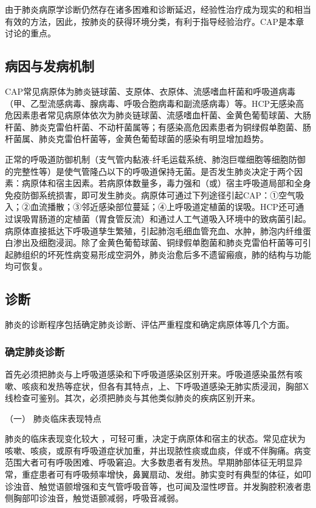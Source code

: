 由于肺炎病原学诊断仍然存在诸多困难和诊断延迟，经验性治疗成为现实的和相当有效的方法，因此，按肺炎的获得环境分类，有利于指导经验治疗。CAP是本章讨论的重点。

\subsection{病因与发病机制}

CAP常见病原体为肺炎链球菌、支原体、衣原体、流感嗜血杆菌和呼吸道病毒（甲、乙型流感病毒、腺病毒、呼吸合胞病毒和副流感病毒）等。HCP无感染高危因素患者常见病原体依次为肺炎链球菌、流感嗜血杆菌、金黄色葡萄球菌、大肠杆菌、肺炎克雷伯杆菌、不动杆菌属等；有感染高危因素患者为铜绿假单胞菌、肠杆菌属、肺炎克雷伯杆菌等，金黄色葡萄球菌的感染有明显增加趋势。

正常的呼吸道防御机制（支气管内黏液-纤毛运载系统、肺泡巨噬细胞等细胞防御的完整性等）是使气管隆凸以下的呼吸道保持无菌。是否发生肺炎决定于两个因素：病原体和宿主因素。若病原体数量多，毒力强和（或）宿主呼吸道局部和全身免疫防御系统损害，即可发生肺炎。病原体可通过下列途径引起CAP：①空气吸入；②血流播散；③邻近感染部位蔓延；④上呼吸道定植菌的误吸。HCP还可通过误吸胃肠道的定植菌（胃食管反流）和通过人工气道吸入环境中的致病菌引起。病原体直接抵达下呼吸道孳生繁殖，引起肺泡毛细血管充血、水肿，肺泡内纤维蛋白渗出及细胞浸润。除了金黄色葡萄球菌、铜绿假单胞菌和肺炎克雷伯杆菌等可引起肺组织的坏死性病变易形成空洞外，肺炎治愈后多不遗留瘢痕，肺的结构与功能均可恢复。

\subsection{诊断}

肺炎的诊断程序包括确定肺炎诊断、评估严重程度和确定病原体等几个方面。

\subsubsection{确定肺炎诊断}

首先必须把肺炎与上呼吸道感染和下呼吸道感染区别开来。呼吸道感染虽然有咳嗽、咳痰和发热等症状，但各有其特点，上、下呼吸道感染无肺实质浸润，胸部X线检查可鉴别。其次，必须把肺炎与其他类似肺炎的疾病区别开来。

\hypertarget{text00272.htmlux5cux23CHP9-5-2-1-1}{}
（一） 肺炎临床表现特点

肺炎的临床表现变化较大
，可轻可重，决定于病原体和宿主的状态。常见症状为咳嗽、咳痰，或原有呼吸道症状加重，并出现脓性痰或血痰，伴或不伴胸痛。病变范围大者可有呼吸困难、呼吸窘迫。大多数患者有发热。早期肺部体征无明显异常，重症患者可有呼吸频率增快，鼻翼扇动、发绀。肺实变时有典型的体征，如叩诊浊音、触觉语颤增强和支气管呼吸音等，也可闻及湿性啰音。并发胸腔积液者患侧胸部叩诊浊音，触觉语颤减弱，呼吸音减弱。

